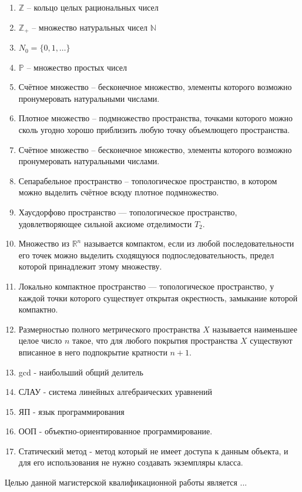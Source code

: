 \documentclass[master, och, diploma, times]{sty/SCWorks}
\theoremstyle{plain}
\theoremstyle{definition}
\begin{document}
\begin{enumerate}
	\item $\mathbb {Z}$ -- кольцо целых рациональных чисел
	\item $\mathbb {Z}_{+}$ -- множество натуральных чисел $\mathbb {N}$
	\item ${N}_0=\{0,1,\dots\}$
	\item $\mathbb {P}$ -- множество простых чисел
	\item Счётное множество -- бесконечное множество, элементы которого возможно пронумеровать натуральными числами.
	\item Плотное множество -- подмножество пространства, точками которого можно сколь угодно хорошо приблизить любую точку объемлющего пространства.
	\item Счётное множество -- бесконечное множество, элементы которого возможно пронумеровать натуральными числами.
	\item Сепарабельное пространство -- топологическое пространство, в котором можно выделить счётное всюду плотное подмножество.
	\item Хаусдорфово пространство — топологическое пространство, удовлетворяющее сильной аксиоме отделимости $T_2$.
	\item Множество из $\mathbb {R}^n$ называется компактом, если из любой последовательности его точек можно выделить сходящуюся подпоследовательность, предел которой принадлежит этому множеству.
	\item Локально компактное пространство — топологическое пространство, у каждой точки которого существует открытая окрестность, замыкание которой компактно.
	\item Размерностью полного метрического пространства $X$ называется наименьшее целое число $n$ такое, что для любого покрытия пространства $X$ существуют вписанное в него подпокрытие кратности $n+1$.
	\item gcd - наибольший общий делитель
	\item СЛАУ - система линейных алгебраических уравнений
	\item ЯП - язык программирования
	\item ООП - объектно-ориентированное программирование.
	\item Статический метод - метод который не имеет доступа к данным объекта, и для его использования не нужно создавать экземпляры класса.
\end{enumerate}

\intro
Целью данной магистерской квалификационной работы является ...
\end{document}
